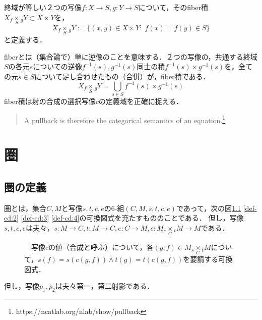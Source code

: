 \documentclass[uplatex, 12pt, dvipdfmx]{jsreport}
\begin{document}
\begin{shadebox}\begin{definition}終域が等しい２つの写像$f:X\rightarrow S, g:Y\rightarrow S$について，その\rm{fiber積}$X_f\underset{S}{\times}{}_gY\subset X\times Y$を，$$X_f\underset{S}{\times}{}_gY:=\{ (x,y)\in X\times Y:\; f(x)=f(y)\in S \}$$と定義する．  \end{definition}\end{shadebox}
fiberとは（集合論で）単に逆像のことを意味する．２つの写像の，共通する終域$S$の各元$s$についての逆像$f^{-1}(s),g^{-1}(s)$同士の積$f^{-1}(s)\times g^{-1}(s)$を，全ての元$s\in S$について足し合わせたもの（合併）が，fiber積である．$$X_f\underset{S}{\times}{}_gY=\bigcup_{s\in S}f^{-1}(s)\times g^{-1}(s)$$
fiber積は射の合成の選択写像$c$の定義域を正確に捉える．

\begin{quote}
    A pullback is therefore the categorical semantics of an equation.\footnote{https://ncatlab.org/nlab/show/pullback}
\end{quote}

\clearpage

\chapter{圏}

\section{圏の定義}
\begin{shadebox}\begin{definition}[圏]\label{def-category}\rm{}圏とは，集合$C,M$と写像$s,t,c,e$の6-組$(C,M,s,t,c,e)$であって，次の図\ref{def-cd:1} \ref{def-cd:2} \ref{def-cd:3} \ref{def-cd:4}の可換図式を充たすもののことである．
    但し，写像$s,t,c,e$は夫々，$s:M\rightarrow C,t:M\rightarrow C,e:C\rightarrow M, c:M_s\underset{C}{\times}{}_tM \rightarrow M$である．
\end{definition}\end{shadebox}

\begin{figure}[ht] \begin{center}  \caption{\label{def-cd:1}　写像$c$の値（合成と呼ぶ）について，各$(g,f)\in M_s\underset{C}{\times}{}_tM$について，$s(f)=s(c(g,f))\wedge t(g)=t(c(g,f))$を要請する可換図式．}
\end{center}\end{figure}
但し，写像$p_1, p_2$は夫々第一，第二射影である．
\end{document}
